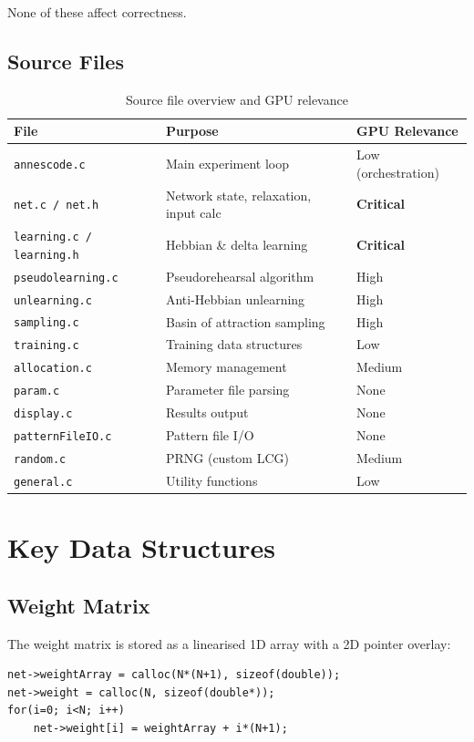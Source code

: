 \documentclass[11pt,a4paper]{article}
\begin{document}
None of these affect correctness.

\subsection{Source Files}

\begin{table}[h]
\centering
\begin{tabular}{lll}
\toprule
\textbf{File} & \textbf{Purpose} & \textbf{GPU Relevance} \\
\midrule
\texttt{annescode.c} & Main experiment loop & Low (orchestration) \\
\texttt{net.c / net.h} & Network state, relaxation, input calc & \textbf{Critical} \\
\texttt{learning.c / learning.h} & Hebbian \& delta learning & \textbf{Critical} \\
\texttt{pseudolearning.c} & Pseudorehearsal algorithm & High \\
\texttt{unlearning.c} & Anti-Hebbian unlearning & High \\
\texttt{sampling.c} & Basin of attraction sampling & High \\
\texttt{training.c} & Training data structures & Low \\
\texttt{allocation.c} & Memory management & Medium \\
\texttt{param.c} & Parameter file parsing & None \\
\texttt{display.c} & Results output & None \\
\texttt{patternFileIO.c} & Pattern file I/O & None \\
\texttt{random.c} & PRNG (custom LCG) & Medium \\
\texttt{general.c} & Utility functions & Low \\
\bottomrule
\end{tabular}
\caption{Source file overview and GPU relevance}
\end{table}

\section{Key Data Structures}

\subsection{Weight Matrix}

The weight matrix is stored as a linearised 1D array with a 2D pointer overlay:
\begin{lstlisting}
net->weightArray = calloc(N*(N+1), sizeof(double));
net->weight = calloc(N, sizeof(double*));
for(i=0; i<N; i++)
    net->weight[i] = weightArray + i*(N+1);
\end{lstlisting}
\end{document}

